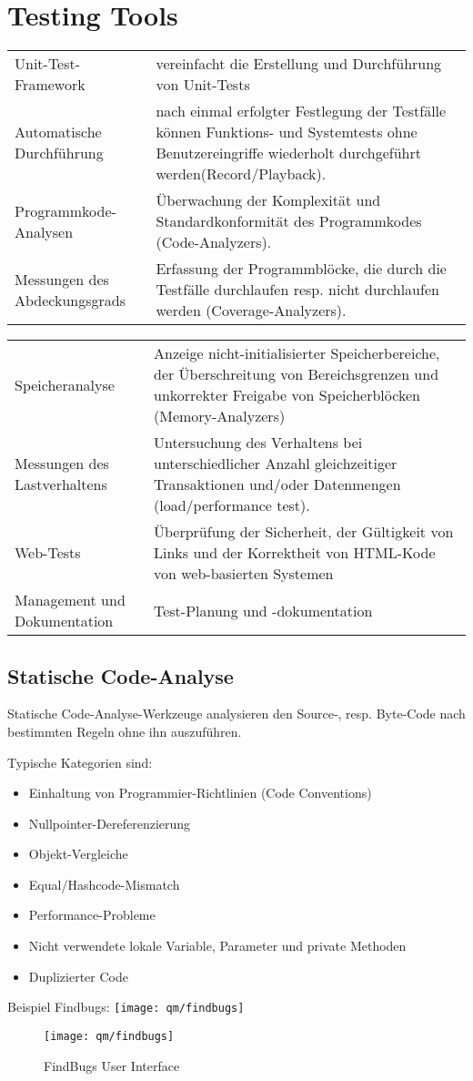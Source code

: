 %
%
\chapter{Testing Tools}
\begin{tabularx}{\linewidth}{l|X}
 Unit-Test-Framework & vereinfacht die Erstellung und Durchführung von
 Unit-Tests\\
 Automatische Durchführung  & nach einmal erfolgter Festlegung der Testfälle
   können Funktions- und Systemtests ohne Benutzereingriffe wiederholt
  durchgeführt werden(Record/Playback).\\
Programmkode-Analysen & \"Uberwachung der Komplexität
  und Standardkonformität des Programmkodes (Code-Analyzers).\\
 Messungen des Abdeckungsgrads & Erfassung der Programmblöcke, die durch
  die Testfälle durchlaufen resp. nicht durchlaufen werden
 (Coverage-Analyzers).\\
\end{tabularx}
\newslide
\begin{tabularx}{\linewidth}{l|X}
 Speicheranalyse & Anzeige nicht-initialisierter
   Speicherbereiche, der \"Uberschreitung von Bereichsgrenzen und unkorrekter
   Freigabe von Speicherblöcken (Memory-Analyzers)\\
 Messungen des Lastverhaltens & Untersuchung des
  Verhaltens bei unterschiedlicher Anzahl gleichzeitiger Transaktionen
  und/oder Datenmengen (load/performance test).\\
 Web-Tests& \"Uberprüfung der Sicherheit, der Gültigkeit von Links und
  der Korrektheit von HTML-Kode von web-basierten Systemen\\
 Management und Dokumentation & Test-Planung und -dokumentation \\
\end{tabularx}
\newpage
\section{Statische Code-Analyse}
Statische Code-Analyse-Werkzeuge analysieren den
 Source-, resp. Byte-Code nach bestimmten Regeln
ohne ihn auszuführen.

Typische Kategorien sind:
\begin{itemize}
\item Einhaltung von Programmier-Richtlinien (Code Conventions)
\item Nullpointer-Dereferenzierung
\item Objekt-Vergleiche
\item Equal/Hashcode-Mismatch
\item Performance-Probleme
\item Nicht verwendete lokale Variable, Parameter und private Methoden
\item Duplizierter Code
\end{itemize}
%
Beispiel Findbugs:
\ifslides
\texttt{[image: qm/findbugs]}
\else
\begin{figure}[H]
\centering
\texttt{[image: qm/findbugs]}
\caption{FindBugs User Interface}
\end{figure}
\fi
%
\newslide
